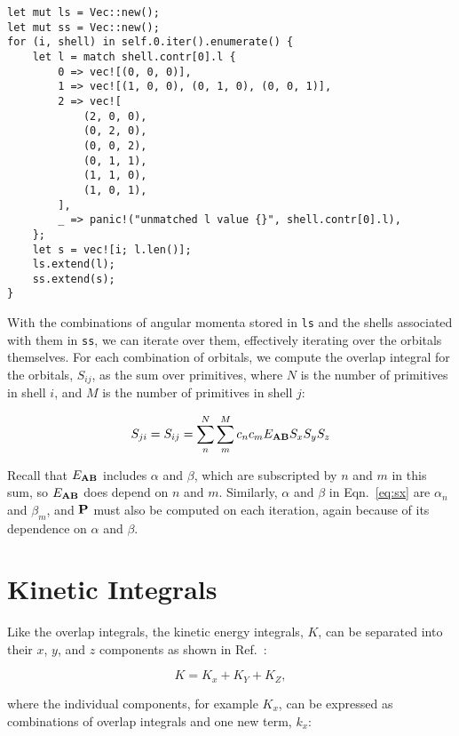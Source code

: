 \documentclass{achemso}
\newcommand\eab{E_{\vb A \vb B}}
\begin{document}
\begin{lstlisting}[caption={Collecting $l$ values for shells}, label={lst:ls}]
let mut ls = Vec::new();
let mut ss = Vec::new();
for (i, shell) in self.0.iter().enumerate() {
    let l = match shell.contr[0].l {
        0 => vec![(0, 0, 0)],
        1 => vec![(1, 0, 0), (0, 1, 0), (0, 0, 1)],
        2 => vec![
            (2, 0, 0),
            (0, 2, 0),
            (0, 0, 2),
            (0, 1, 1),
            (1, 1, 0),
            (1, 0, 1),
        ],
        _ => panic!("unmatched l value {}", shell.contr[0].l),
    };
    let s = vec![i; l.len()];
    ls.extend(l);
    ss.extend(s);
}
\end{lstlisting}

With the combinations of angular momenta stored in \verb|ls| and the shells
associated with them in \verb|ss|, we can iterate over them, effectively
iterating over the orbitals themselves. For each combination of orbitals, we
compute the overlap integral for the orbitals, $S_{ij}$, as the sum over
primitives, where $N$ is the number of primitives in shell $i$, and $M$ is the
number of primitives in shell $j$:

\begin{equation}
  \label{eq:sij}
  S_{ji} = S_{ij} = \sum_n^N\sum_m^M c_n c_m E_{\vb A \vb B} S_x S_y S_z
\end{equation}

Recall that $\eab$ includes $\alpha$ and $\beta$, which are subscripted by $n$
and $m$ in this sum, so $\eab$ does depend on $n$ and $m$. Similarly, $\alpha$
and $\beta$ in Eqn.~\ref{eq:sx} are $\alpha_n$ and $\beta_m$, and $\vb P$ must
also be computed on each iteration, again because of its dependence on $\alpha$
and $\beta$.

\section{Kinetic Integrals}
\label{sec:kinetic}

Like the overlap integrals, the kinetic energy integrals, $K$, can be separated
into their $x$, $y$, and $z$ components as shown in Ref.~:

\begin{equation}
  \label{eq:k}
  K = K_x + K_Y + K_Z,
\end{equation}

\noindent
where the individual components, for example $K_x$, can be expressed as
combinations of overlap integrals and one new term, $k_x$:
\end{document}

